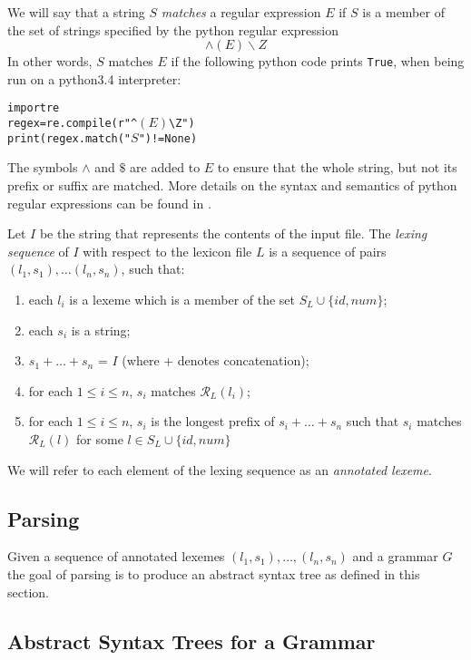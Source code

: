 \documentclass[a4paper,10pt]{article}
\begin{document}
We will say that a string $S$ \textit{matches} a regular expression $E$ if $S$ is a member of the set of strings specified by  the python regular expression 
$$\wedge (E) \backslash Z $$
In other words, $S$ matches $E$ if the following python code prints \texttt{True}, when being run on a   python3.4 interpreter:
\begin{alltt}
import re
regex = re.compile(r"^\((E)\)\textbackslash{}Z")
print(regex.match("\(S\)") != None)
\end{alltt}

The symbols $\wedge$ and $\$$ are added to $E$ to ensure that the whole string, but not its prefix or suffix are matched. More details on  the syntax and semantics of python regular expressions can be found in \cite{pythonre}.

Let $I$ be the string that represents the contents of the input file. 
The \textit{lexing sequence} of $I$ with respect to the lexicon file $L$ is a sequence of pairs $(l_1,s_1),\ldots (l_n,s_n)$, such that:

\begin{enumerate}
\item each $l_i$ is a lexeme which is a member of the set $S_L \cup \{id,num\}$;
\item each $s_i$ is a string;
\item $s_1+\ldots+s_n$ = $I$ (where + denotes concatenation);
\item for each $1 \le i  \le n$, $s_i$ matches $\mathcal{R}_L(l_i)$;
\item for each $1 \le i \le n$, $s_i$ is the longest prefix of $s_i+\ldots+s_n$ such that $s_i$ matches  $\mathcal{R}_L(l)$ for some  $l \in  S_L \cup \{id,num\}$ 
\end{enumerate}


We will refer to each element of the lexing sequence as an \textit{annotated lexeme}.






\subsection{Parsing}\label{pars}
Given a sequence of annotated lexemes  $(l_1,s_1),\ldots, (l_n,s_n)$ and a grammar $G$  the goal of parsing is to produce an abstract syntax tree  as defined in this section. 

\subsection{Abstract Syntax Trees for a  Grammar}
\end{document}
